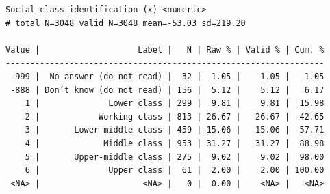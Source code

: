 \documentclass[
  letterpaper,
  DIV=11,
  numbers=noendperiod]{scrreprt}
\newenvironment{Shaded}{\begin{snugshade}}{\end{snugshade}}
\newcommand{\AttributeTok}[1]{\textcolor[rgb]{0.40,0.45,0.13}{#1}}
\newcommand{\DecValTok}[1]{\textcolor[rgb]{0.68,0.00,0.00}{#1}}
\newcommand{\FunctionTok}[1]{\textcolor[rgb]{0.28,0.35,0.67}{#1}}
\newcommand{\NormalTok}[1]{\textcolor[rgb]{0.00,0.23,0.31}{#1}}
\newcommand{\OtherTok}[1]{\textcolor[rgb]{0.00,0.23,0.31}{#1}}
\newcommand{\SpecialCharTok}[1]{\textcolor[rgb]{0.37,0.37,0.37}{#1}}
\newcommand{\StringTok}[1]{\textcolor[rgb]{0.13,0.47,0.30}{#1}}
\begin{document}
\begin{Shaded}
\end{Shaded}

\begin{verbatim}
Social class identification (x) <numeric> 
# total N=3048 valid N=3048 mean=-53.03 sd=219.20

Value |                    Label |   N | Raw % | Valid % | Cum. %
-----------------------------------------------------------------
 -999 |  No answer (do not read) |  32 |  1.05 |    1.05 |   1.05
 -888 | Don’t know (do not read) | 156 |  5.12 |    5.12 |   6.17
    1 |              Lower class | 299 |  9.81 |    9.81 |  15.98
    2 |            Working class | 813 | 26.67 |   26.67 |  42.65
    3 |       Lower-middle class | 459 | 15.06 |   15.06 |  57.71
    4 |             Middle class | 953 | 31.27 |   31.27 |  88.98
    5 |       Upper-middle class | 275 |  9.02 |    9.02 |  98.00
    6 |              Upper class |  61 |  2.00 |    2.00 | 100.00
 <NA> |                     <NA> |   0 |  0.00 |    <NA> |   <NA>
\end{verbatim}

\begin{Shaded}
\end{Shaded}
\end{document}
